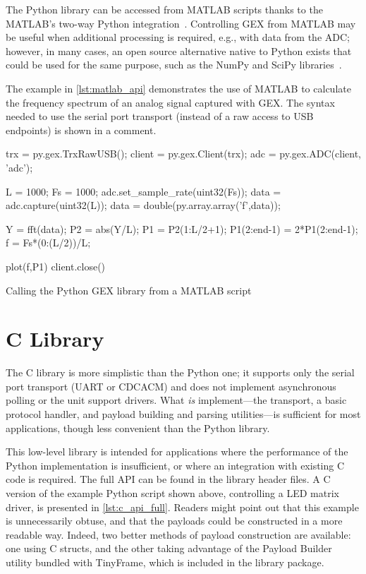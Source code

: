 The Python library can be accessed from MATLAB scripts thanks to the MATLAB's two-way Python integration~\cite{matlabpy}. Controlling GEX from MATLAB may be useful when additional processing is required, e.g., with data from the \gls{ADC}; however, in many cases, an open source alternative native to Python exists that could be used for the same purpose, such as the NumPy and SciPy libraries~\cite{numpyscipy}.

The example in \cref{lst:matlab_api} demonstrates the use of MATLAB to calculate the frequency spectrum of an analog signal captured with GEX. The syntax needed to use the serial port transport (instead of a raw access to USB endpoints) is shown in a comment.

\begin{listing}[h]
	\begin{matlabcode}
	
	trx = py.gex.TrxRawUSB();
	client = py.gex.Client(trx);
	adc = py.gex.ADC(client, 'adc');
	
	L = 1000;
	Fs = 1000;
	adc.set_sample_rate(uint32(Fs)); %
	data = adc.capture(uint32(L));
	data = double(py.array.array('f',data)); %
	
	Y = fft(data);
	P2 = abs(Y/L);
	P1 = P2(1:L/2+1);
	P1(2:end-1) = 2*P1(2:end-1);
	f = Fs*(0:(L/2))/L;
	
	plot(f,P1)
	client.close()
	\end{matlabcode}
	\caption{\label{lst:matlab_api} Calling the Python GEX library from a MATLAB script}
\end{listing}


\section{C Library}

The C library is more simplistic than the Python one; it supports only the serial port transport (\gls{UART} or \gls{CDCACM}) and does not implement asynchronous polling or the unit support drivers. What \textit{is} implement---the transport, a basic protocol handler, and payload building and parsing utilities---is sufficient for most applications, though less convenient than the Python library.

This low-level library is intended for applications where the performance of the Python implementation is insufficient, or where an integration with existing C code is required. The full \gls{API} can be found in the library header files. A C version of the example Python script shown above, controlling a \gls{LED} matrix driver, is presented in \cref{lst:c_api_full}. Readers might point out that this example is unnecessarily obtuse, and that the payloads could be constructed in a more readable way. Indeed, two better methods of payload construction are available: one using C structs, and the other taking advantage of the Payload Builder utility bundled with TinyFrame, which is included in the library package.


